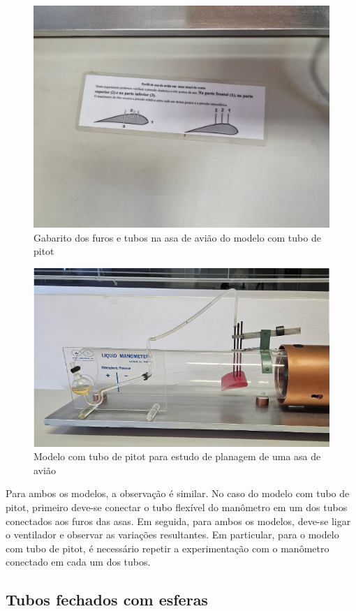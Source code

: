     \begin{figure}[H]
        \centering
        \includegraphics[width=0.35\linewidth]{fig/furos.jpeg}
        \caption{Gabarito dos furos e tubos na asa de avião do modelo com tubo de pitot} %
        \label{furos.png}
    \end{figure}
    \begin{figure}[H]
        \centering
        \includegraphics[width=0.35\linewidth]{fig/asa_pitot.png}
        \caption{Modelo com tubo de pitot para estudo de planagem de uma asa de avião}
        \label{asa_pitot.png}
    \end{figure}

    Para ambos os modelos, a observação é similar. No caso do modelo com tubo de pitot, primeiro deve-se conectar o tubo flexível do manômetro em um dos tubos conectados aos furos das asas. Em seguida, para ambos os modelos, deve-se ligar o ventilador e observar as variações resultantes. Em particular, para o modelo com tubo de pitot, é necessário repetir a experimentação com o manômetro conectado em cada um dos tubos.

\subsection{Tubos fechados com esferas}